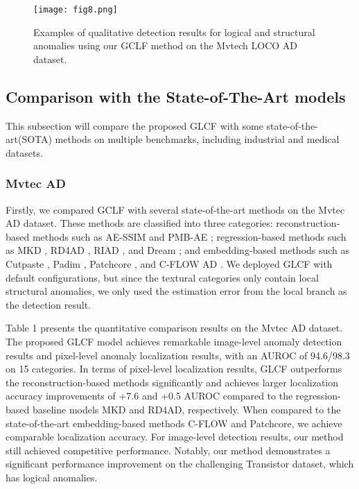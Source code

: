 \documentclass[lettersize,journal]{IEEEtran}
\begin{document}
\begin{figure*}[t]
\centerline{\texttt{[image: fig8.png]}}
\caption[width=\textwidth]{
Examples of qualitative detection results for logical and structural anomalies using our GCLF method on the Mvtech LOCO AD dataset. }

\label{fig1}
\end{figure*}


\subsection{Comparison with the State-of-The-Art models}

This subsection will compare the proposed GLCF with some state-of-the-art(SOTA) methods on multiple benchmarks, including industrial and medical datasets.

\subsubsection{\textbf{Mvtec AD}}

Firstly, we compared GCLF with several state-of-the-art methods on the Mvtec AD dataset. These methods are classified into three categories: reconstruction-based methods such as AE-SSIM \cite{r2} and PMB-AE \cite{r7}; regression-based methods such as MKD \cite{r13}, RD4AD \cite{r14}, RIAD \cite{r11}, and Dream \cite{r12}; and embedding-based methods such as Cutpaste \cite{r34}, Padim \cite{r23}, Patchcore \cite{r22}, and C-FLOW AD \cite{r35}. We deployed GLCF with default configurations, but since the textural categories only contain local structural anomalies, we only used the estimation error from the local branch as the detection result.

Table 1 presents the quantitative comparison results on the Mvtec AD dataset. The proposed GLCF model achieves remarkable image-level anomaly detection results and pixel-level anomaly localization results, with an AUROC of 94.6/98.3 on 15 categories. In terms of pixel-level localization results, GLCF outperforms the reconstruction-based methods significantly and achieves larger localization accuracy improvements of +7.6 and +0.5 AUROC compared to the regression-based baseline models MKD and RD4AD, respectively. When compared to the state-of-the-art embedding-based methods C-FLOW and Patchcore, we achieve comparable localization accuracy. For image-level detection results, our method still achieved competitive performance. Notably, our method demonstrates a significant performance improvement on the challenging Transistor dataset, which has logical anomalies.
\end{document}
